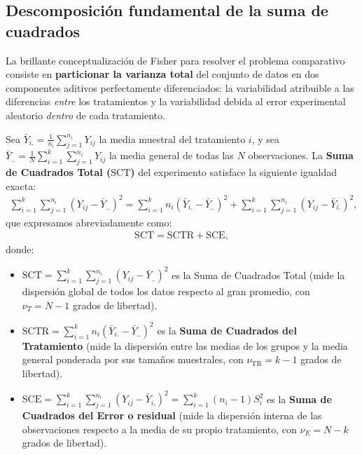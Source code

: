\subsection{Descomposición fundamental de la suma de cuadrados}

La brillante conceptualización de Fisher para resolver el problema comparativo consiste en \textbf{particionar la varianza total} del conjunto de datos en dos componentes aditivos perfectamente diferenciados: la variabilidad atribuible a las diferencias \emph{entre} los tratamientos y la variabilidad debida al error experimental aleatorio \emph{dentro} de cada tratamiento.

\begin{teorema}
	Sea $\bar{Y}_{i.} = \frac{1}{n_i}\sum_{j=1}^{n_i} Y_{ij}$ la media muestral del tratamiento $i$, y sea $\bar{Y}_{..} = \frac{1}{N}\sum_{i=1}^k \sum_{j=1}^{n_i} Y_{ij}$ la media general de todas las $N$ observaciones. La \textbf{Suma de Cuadrados Total ($\text{SCT}$)} del experimento satisface la siguiente igualdad exacta:
	\begin{align}
		\sum_{i=1}^k \sum_{j=1}^{n_i} (Y_{ij} - \bar{Y}_{..})^2 = \sum_{i=1}^k n_i (\bar{Y}_{i.} - \bar{Y}_{..})^2 + \sum_{i=1}^k \sum_{j=1}^{n_i} (Y_{ij} - \bar{Y}_{i.})^2,
		\label{eq:particion_suma_cuadrados}
	\end{align}
	que expresamos abreviadamente como:
	\begin{align}
		\text{SCT} = \text{SCTR} + \text{SCE},
	\end{align}
	donde:
	\begin{itemize}
		\item $\text{SCT} = \sum_{i=1}^k \sum_{j=1}^{n_i} (Y_{ij} - \bar{Y}_{..})^2$ es la Suma de Cuadrados Total (mide la dispersión global de todos los datos respecto al gran promedio, con $\nu_T = N - 1$ grados de libertad).
		\item $\text{SCTR} = \sum_{i=1}^k n_i (\bar{Y}_{i.} - \bar{Y}_{..})^2$ es la \textbf{Suma de Cuadrados del Tratamiento} (mide la dispersión entre las medias de los grupos y la media general ponderada por sus tamaños muestrales, con $\nu_{\text{TR}} = k - 1$ grados de libertad).
		\item $\text{SCE} = \sum_{i=1}^k \sum_{j=1}^{n_i} (Y_{ij} - \bar{Y}_{i.})^2 = \sum_{i=1}^k (n_i - 1) S_i^2$ es la \textbf{Suma de Cuadrados del Error o residual} (mide la dispersión interna de las observaciones respecto a la media de su propio tratamiento, con $\nu_E = N - k$ grados de libertad).
	\end{itemize}
\end{teorema}

